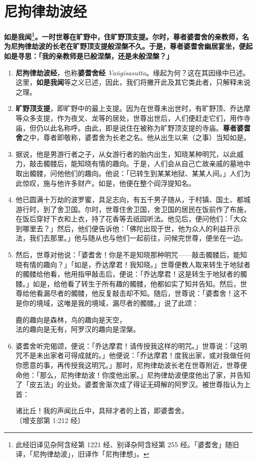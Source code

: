 \section{尼拘律劫波经}

\textbf{如是我闻\footnote{此经旧译见杂阿含经第 1221 经、别译杂阿含经第 255 经。「婆耆舍」随旧译，「尼拘律劫波」，旧译作「尼拘律想」。}。一时世尊在旷野中，住旷野顶支提。尔时，尊者婆耆舍的亲教师，名为尼拘律劫波的长老在旷野顶支提般涅槃不久。于是，尊者婆耆舍幽居宴坐，便起如是寻思：「我的亲教师是已般涅槃，还是未般涅槃？」}

\begin{enumerate}\item \textbf{尼拘律劫波经}，也称\textbf{婆耆舍经} \textit{Vaṅgīsasutta}。缘起为何？这在其因缘中已述。这里，\textbf{如是我闻}等之义已述，因此，我们将撇开此及其它类此者，只解释未说之理。
\item \textbf{旷野顶支提}，即旷野中的最上支提。因为在世尊未出世时，有旷野顶、乔达摩等众多支提，作为夜叉、龙等的居处，世尊出世后，人们便赶走它们，用作寺庙，但仍以此名称呼。由此，即是说住在被称为旷野顶支提的寺庙。\textbf{尊者婆耆舍}之中，尊者即敬称，婆耆舍为长老之名。他从出生以来（之事）当知如是。
\item 据说，他是男游行者之子，从女游行者的胎内出生，知晓某种明咒，以此威力，敲击髑髅后，能知晓有情的趣向。于是，人们会从自己亡故亲戚的墓地中取出髑髅，问他他们的趣向。他说：「已转生到某某地狱、某某人间。」人们为此惊叹，施与他许多财产。如是，他便在整个阎浮提知名。
\item 他已圆满十万劫的波罗蜜，具足志向，有五千男子随从，于村镇、国土、都城游行时，到了舍卫国。尔时，世尊住舍卫国，舍卫国的居民在饭前作了布施，在饭后穿好下衣和上衣，持了花香等去祇园听法。他见后，便问他们：「大众到哪里去？」然后，他们便告诉他：「佛陀出现于世，他为众人的利益开示法，我们去那里。」他与随从也与他们一起前往，问候完世尊，便坐在一边。
\item 然后，世尊对他说：「婆耆舍！你是不是知晓那种明咒——敲击髑髅后，能知晓有情的趣向？」「如是，乔达摩君！我知晓。」世尊便教人取来转生于地狱者的髑髅给他看，他用指甲敲击后，便说：「乔达摩君！这是转生于地狱者的髑髅。」如是，给他看了转生于所有趣的髑髅，他都如实了知并告知。然后，世尊给他看漏尽者的髑髅，他反复敲击却不知。随后，世尊说：「婆耆舍！这不是你的境域，这唯是我的境域，漏尽者的髑髅。」说了此颂：\begin{quoting}鹿的趣向是森林，鸟的趣向是天空，\\法的趣向是无有，阿罗汉的趣向是涅槃。\end{quoting}
\item 婆耆舍听完偈颂，便说：「乔达摩君！请传授我这样的明咒。」世尊说：「这明咒不是未出家者可得成就的。」他便说：「乔达摩君！度我出家，或对我做任何你愿意的事，再传授我这明咒。」那时，尼拘律劫波长老在世尊附近，世尊便命他：「那么，尼拘律劫波！你度他出家。」尼拘律劫波便度他出了家，并告知了「皮五法」的业处。婆耆舍渐次成了得证无碍解的阿罗汉。被世尊指认为上首：\begin{quoting}诸比丘！我的声闻比丘中，具辩才者的上首，即婆耆舍。{\bluefootnotesize 〔增支部第 1:212 经〕}\end{quoting}

\end{enumerate}
